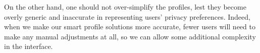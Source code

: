 On the other hand, one should not over-simplify the profiles, lest they become overly generic and inaccurate in representing users' privacy preferences. Indeed, when we make our smart profile solutions more accurate, fewer users will need to make any manual adjustments at all, so we can allow some additional complexity in the interface.